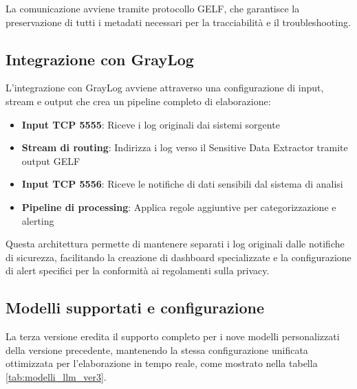 \documentclass[12pt]{report}
\begin{document}
La comunicazione avviene tramite protocollo GELF, che garantisce la preservazione di tutti i metadati necessari per la tracciabilità e il troubleshooting.

\subsection{Integrazione con GrayLog}
\label{subsec:ver3_integrazione}

L'integrazione con GrayLog avviene attraverso una configurazione di input, stream e output che crea un pipeline completo di elaborazione:

\begin{itemize}
    \item \textbf{Input TCP 5555}: Riceve i log originali dai sistemi sorgente
    \item \textbf{Stream di routing}: Indirizza i log verso il Sensitive Data Extractor tramite output GELF
    \item \textbf{Input TCP 5556}: Riceve le notifiche di dati sensibili dal sistema di analisi
    \item \textbf{Pipeline di processing}: Applica regole aggiuntive per categorizzazione e alerting
\end{itemize}

Questa architettura permette di mantenere separati i log originali dalle notifiche di sicurezza, facilitando la creazione di dashboard specializzate e la configurazione di alert specifici per la conformità ai regolamenti sulla privacy.

\subsection{Modelli supportati e configurazione}
\label{subsec:ver3_modelli_supportati}

La terza versione eredita il supporto completo per i nove modelli personalizzati della versione precedente, mantenendo la stessa configurazione unificata ottimizzata per l'elaborazione in tempo reale, come mostrato nella tabella \ref{tab:modelli_llm_ver3}.
\end{document}
